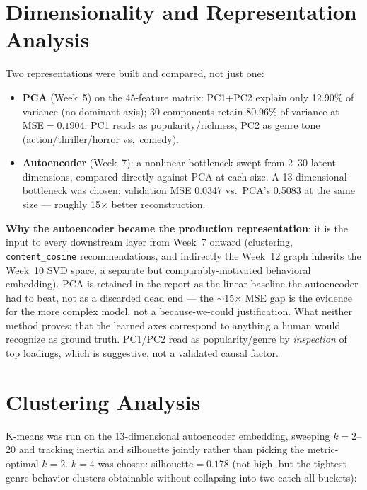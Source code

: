 \documentclass[12pt,a4paper]{article}
\begin{document}
\section{Dimensionality and Representation Analysis}

Two representations were built and compared, not just one:

\begin{itemize}[nosep]
  \item \textbf{PCA} (Week~5) on the 45-feature matrix: PC1+PC2 explain only 12.90\% of variance
    (no dominant axis); 30 components retain 80.96\% of variance at MSE$=0.1904$. PC1 reads as
    popularity/richness, PC2 as genre tone (action/thriller/horror vs.\ comedy).
  \item \textbf{Autoencoder} (Week~7): a nonlinear bottleneck swept from 2--30 latent dimensions,
    compared directly against PCA at each size. A 13-dimensional bottleneck was chosen: validation
    MSE 0.0347 vs.\ PCA's 0.5083 at the same size --- roughly 15$\times$ better reconstruction.
\end{itemize}

\textbf{Why the autoencoder became the production representation}: it is the input to every
downstream layer from Week~7 onward (clustering, \texttt{content\_cosine} recommendations, and
indirectly the Week~12 graph inherits the Week~10 SVD space, a separate but comparably-motivated
behavioral embedding). PCA is retained in the report as the linear baseline the autoencoder had to
beat, not as a discarded dead end --- the $\sim$15$\times$ MSE gap is the evidence for the more
complex model, not a because-we-could justification. What neither method proves: that the learned
axes correspond to anything a human would recognize as ground truth. PC1/PC2 read as
popularity/genre by \emph{inspection} of top loadings, which is suggestive, not a validated causal
factor.

\section{Clustering Analysis}

K-means was run on the 13-dimensional autoencoder embedding, sweeping $k=2$--20 and tracking
inertia and silhouette jointly rather than picking the metric-optimal $k=2$. \textbf{$k=4$} was
chosen: silhouette$=0.178$ (not high, but the tightest genre-behavior clusters obtainable without
collapsing into two catch-all buckets):
\end{document}

